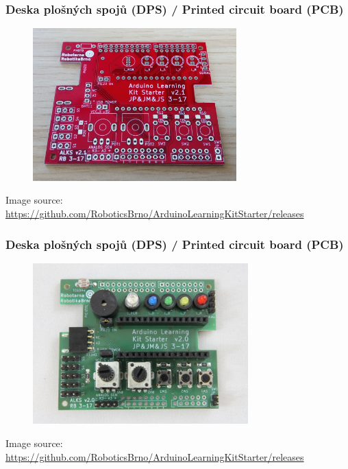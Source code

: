 \documentclass[12;pt,t]{beamer} %
\newcommand{\srctext}[1]{{\fontsize{7}{9}\selectfont\textcolor{sourcesclr}{#1}}}
\begin{document}
\begin{frame}
\frametitle{Deska plošných spojů (DPS) / Printed circuit board (PCB)}    	
\begin{figure}[H]
	\includegraphics[width=0.7\textwidth]{img/ALKS_v2_1_1_01_top.JPG}
\end{figure}
\srctext{Image source: \url{https://github.com/RoboticsBrno/ArduinoLearningKitStarter/releases}}
\end{frame}


\begin{frame}
\frametitle{Deska plošných spojů (DPS) / Printed circuit board (PCB)}    	
\begin{figure}[H]
	\includegraphics[width=0.74\textwidth]{img/ALKS_v2_0_2_01_top.JPG}
\end{figure}
\srctext{Image source: \url{https://github.com/RoboticsBrno/ArduinoLearningKitStarter/releases}}
\end{frame}
\end{document}
